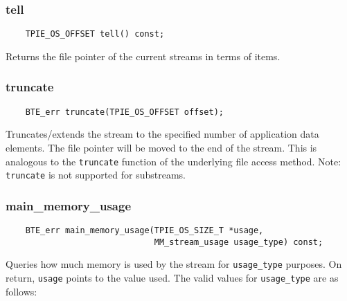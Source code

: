 \subsubsection{tell}

\begin{lstlisting}
    TPIE_OS_OFFSET tell() const;
\end{lstlisting}

\noindent
Returns the file pointer of the current streams in terms of items.


\vspace*{\baselineskip}
\subsubsection{truncate}

\begin{lstlisting}
    BTE_err truncate(TPIE_OS_OFFSET offset);
\end{lstlisting}

\noindent
Truncates/extends the stream to the specified number of application
data elements. The file pointer will be moved to the end of the
stream. This is analogous to the \lstinline|truncate| function of the
underlying file access method.  Note: \lstinline|truncate| is not
supported for substreams.

\vspace*{\baselineskip}
\subsubsection{main\_memory\_usage}

\begin{lstlisting}
    BTE_err main_memory_usage(TPIE_OS_SIZE_T *usage,
                              MM_stream_usage usage_type) const;
\end{lstlisting}

\noindent
Queries how much memory is used by the stream for
\lstinline|usage_type| purposes. On return, \lstinline|usage| points
to the value used. The valid values for \lstinline|usage_type| are as
follows:

